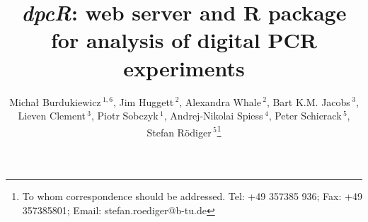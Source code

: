\documentclass[a4,center,fleqn]{NAR}
\begin{document}
\title{\textit{dpcR}: web server and R package for analysis of digital PCR 
experiments}

\author{%
Micha\l{} Burdukiewicz\,$^{1,6}$,
Jim Huggett\,$^{2}$,
Alexandra Whale\,$^{2}$,
Bart K.M. Jacobs\,$^{3}$,
Lieven Clement\,$^{3}$,
Piotr Sobczyk\,$^{1}$,
Andrej-Nikolai Spiess\,$^{4}$,
Peter Schierack\,$^{5}$,
Stefan R\"odiger\,$^{5}$\footnote{To whom correspondence should be addressed.
Tel: +49 357385 936; Fax: +49 357385801; Email: stefan.roediger@b-tu.de}}

\address{%
$^{1}$Department of Genomics, Faculty of Biotechnology, University of 
Wroc\l{}aw, Wroc\l{}aw, Poland
and
$^{2}$Molecular and Cell Biology Team, LGC, Teddington, United Kingdom
and
$^{3}$Department of Applied Mathematics, Computer Science and Statistics, Ghent 
University, Belgium
and
$^{4}$University Medical Center Hamburg-Eppendorf, Hamburg, Germany
and
$^{5}$Institute of Biotechnology, Brandenburg University of Technology 
Cottbus~--~Senftenberg, Gro\ss{}enhainer Str. 57, 01968, Senftenberg, Germany
}


\maketitle
\end{document}

